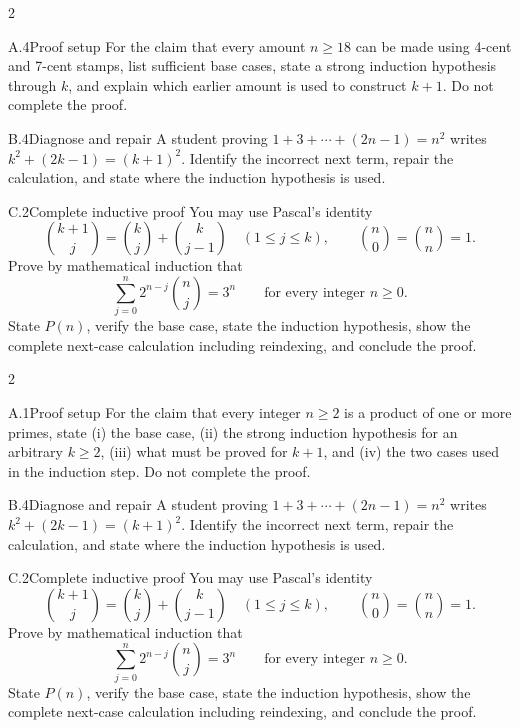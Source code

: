 \documentclass[9pt]{extarticle}
\begin{document}
\CoreWorkArea
\FormBreak
{}
\begin{multicols}{2}
\begin{CompactCoreProblem}{A.4}{Proof setup}
For the claim that every amount $n\ge18$ can be made using 4-cent and 7-cent stamps, list sufficient base cases, state a strong induction hypothesis through $k$, and explain which earlier amount is used to construct $k+1$. Do not complete the proof.
\end{CompactCoreProblem}
\begin{CompactCoreProblem}{B.4}{Diagnose and repair}
A student proving $1+3+\cdots+(2n-1)=n^2$ writes $k^2+(2k-1)=(k+1)^2$. Identify the incorrect next term, repair the calculation, and state where the induction hypothesis is used.
\end{CompactCoreProblem}
\end{multicols}
\begin{CompactCoreProblem}{C.2}{Complete inductive proof}
You may use Pascal's identity
\[
\binom{k+1}{j}=\binom{k}{j}+\binom{k}{j-1}
\quad(1\le j\le k),\qquad
\binom{n}{0}=\binom{n}{n}=1.
\]
Prove by mathematical induction that
\[
\sum_{j=0}^{n} 2^{n-j}\binom{n}{j}=3^n\qquad\text{for every integer }n\ge0.
\]
State $P(n)$, verify the base case, state the induction hypothesis, show the complete next-case calculation including reindexing, and conclude the proof.
\end{CompactCoreProblem}
\CoreWorkArea
\FormBreak
{}
\begin{multicols}{2}
\begin{CompactCoreProblem}{A.1}{Proof setup}
For the claim that every integer $n\ge2$ is a product of one or more primes, state (i) the base case, (ii) the strong induction hypothesis for an arbitrary $k\ge2$, (iii) what must be proved for $k+1$, and (iv) the two cases used in the induction step. Do not complete the proof.
\end{CompactCoreProblem}
\begin{CompactCoreProblem}{B.4}{Diagnose and repair}
A student proving $1+3+\cdots+(2n-1)=n^2$ writes $k^2+(2k-1)=(k+1)^2$. Identify the incorrect next term, repair the calculation, and state where the induction hypothesis is used.
\end{CompactCoreProblem}
\end{multicols}
\begin{CompactCoreProblem}{C.2}{Complete inductive proof}
You may use Pascal's identity
\[
\binom{k+1}{j}=\binom{k}{j}+\binom{k}{j-1}
\quad(1\le j\le k),\qquad
\binom{n}{0}=\binom{n}{n}=1.
\]
Prove by mathematical induction that
\[
\sum_{j=0}^{n} 2^{n-j}\binom{n}{j}=3^n\qquad\text{for every integer }n\ge0.
\]
State $P(n)$, verify the base case, state the induction hypothesis, show the complete next-case calculation including reindexing, and conclude the proof.
\end{CompactCoreProblem}
\end{document}
